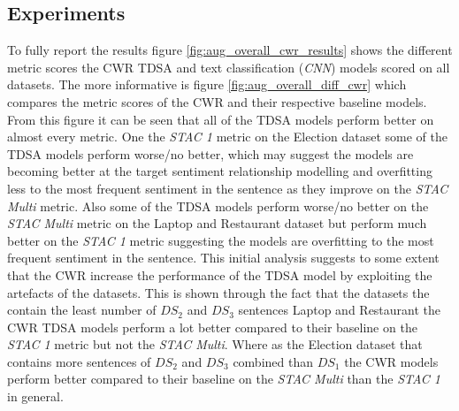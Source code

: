 \subsection{Experiments}
To fully report the results figure \ref{fig:aug_overall_cwr_results} shows the different metric scores the CWR TDSA and text classification (\textit{CNN}) models scored on all datasets. The more informative is figure \ref{fig:aug_overall_diff_cwr} which compares the metric scores of the CWR and their respective baseline models. From this figure it can be seen that all of the TDSA models perform better on almost every metric. One the \textit{STAC 1} metric on the Election dataset some of the TDSA models perform worse/no better, which may suggest the models are becoming better at the target sentiment relationship modelling and overfitting less to the most frequent sentiment in the sentence as they improve on the \textit{STAC Multi} metric. Also some of the TDSA models perform worse/no better on the \textit{STAC Multi} metric on the Laptop and Restaurant dataset but perform much better on the \textit{STAC 1} metric suggesting the models are overfitting to the most frequent sentiment in the sentence. This initial analysis suggests to some extent that the CWR increase the performance of the TDSA model by exploiting the artefacts of the datasets. This is shown through the fact that the datasets the contain the least number of $DS_2$ and $DS_3$ sentences Laptop and Restaurant the CWR TDSA models perform a lot better compared to their baseline on the \textit{STAC 1} metric but not the \textit{STAC Multi}. Where as the Election dataset that contains more sentences of $DS_2$ and $DS_3$ combined than $DS_1$ the CWR models perform better compared to their baseline on the \textit{STAC Multi} than the \textit{STAC 1} in general. 

